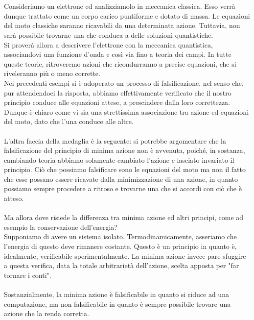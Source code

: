 \documentclass[]{article}
\begin{document}
	\\\\
	Consideriamo un elettrone ed analizziamolo in meccanica classica. Esso verrà dunque trattato come un corpo carico puntiforme e dotato di massa. 
	Le equazioni del moto classiche saranno ricavabili da una determinata azione. Tuttavia, non sarà possibile trovarne una che conduca a delle soluzioni quantistiche.\\
	Si proverà allora a descrivere l'elettrone con la meccanica quantistica, associandovi una funzione d'onda e così via fino a teoria dei campi. In tutte queste teorie, ritroveremo azioni che ricondurranno a precise equazioni, che si riveleranno più o meno corrette.\\
	Nei precedenti esempi si è adoperato un processo di falsificazione, nel senso che, pur attendendoci la risposta, abbiamo effettivamente verificato che il nostro principio conduce alle equazioni attese, a prescindere dalla loro correttezza. Dunque è chiaro come vi sia una strettissima associazione tra azione ed equazioni del moto, dato che l'una conduce alle altre.\\
	\\
	L'altra faccia della medaglia è la seguente: si potrebbe argomentare che la falsificazione del principio di minima azione non è avvenuta, poiché, in sostanza, cambiando teoria abbiamo solamente cambiato l'azione e lasciato invariato il principio. Ciò che possiamo falsificare sono le equazioni del moto ma non il fatto che esse possano essere ricavate dalla minimizzazione di una azione, in quanto possiamo sempre procedere a ritroso e trovarne una che si accordi con ciò che è atteso.\\ 
	\\
	Ma allora dove risiede la differenza tra minima azione ed altri principi, come ad esempio la conservazione dell'energia?\\
	Supponiamo di avere un sistema isolato. Termodinamicamente, asseriamo che l'energia di questo deve rimanere costante. Questo è un principio in quanto è, idealmente, verificabile sperimentalmente. La minima azione invece pare sfuggire a questa verifica, data la totale arbitrarietà dell'azione, scelta apposta per "far tornare i conti".\\
	\\
	Sostanzialmente, la minima azione è falsificabile in quanto si riduce ad una computazione, ma non falsificabile in quanto è sempre possibile trovare una azione che la renda corretta.
\end{document}
